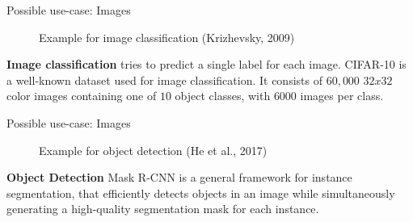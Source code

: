 \documentclass[11pt,compress,t,notes=noshow, xcolor=table]{beamer}
\begin{document}
\begin{frame} {Possible use-case: Images}
\begin{figure}
\centering
{}
\caption{Example for image classification (Krizhevsky, 2009)}
\end{figure}
\textbf{Image classification} tries to predict a single label for each image.
\footnotesize CIFAR-10 is a well-known dataset used for image classification. It consists of $60,000$ $32x32$ color images containing one of $10$ object classes, with $6000$ images per class. 
\end{frame}

\begin{frame} {Possible use-case: Images}
\begin{figure}
\centering
{}
\caption{Example for object detection (He et al., 2017)}
\end{figure}
\textbf{Object Detection}
\footnotesize Mask R-CNN is a general framework for instance segmentation, that efficiently detects objects in an image while simultaneously generating a high-quality segmentation mask for each instance.
\end{frame}
\end{document}
